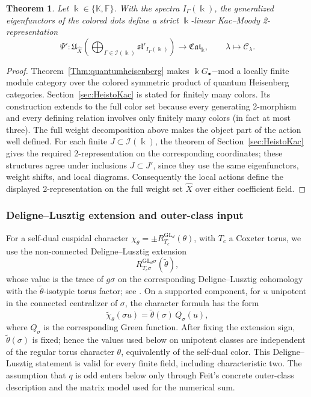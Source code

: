 \documentclass[12pt]{amsart}
\numberwithin{itemcounter}{subsection}
\theoremstyle{plain}
\newtheorem{theorem}{Theorem}[section]
\theoremstyle{definition}
\theoremstyle{remark}
\numberwithin{equation}{section}
\def\bbF{\mathbb{F}}
\def\bbK{\mathbb{K}}
\def\k{\Bbbk}
\def\fraks{\mathfrak{s}}
\def\frakl{\mathfrak{l}}
\def\frakU{\mathfrak{U}}
\def\calI{\mathcal{I}}
\def\frakl{\mathfrak{l}}
\def\GL{\mathrm{GL}}
\begin{document}
\begin{theorem}\label{ThmB}
Let \(\k\in\{\bbK,\bbF\}\).  With the spectra \(I_\Gamma(\k)\), the
generalized eigenfunctors of the colored dots define a strict \(\k\)-linear
Kac--Moody 2-representation
\[
\Psi':\frakU_{\widehat X}\!\left(
\bigoplus_{\Gamma\in\calI(\k)}
\fraks\frakl'_{I_\Gamma(\k)}\right)
\longrightarrow
\mathfrak{Cat}_\k,\qquad \lambda\longmapsto\mathcal C_\lambda.
\]
\end{theorem}
\begin{proof}
Theorem~\ref{Thm:quantumheisenberg} makes
\(\k G_\bullet\mathrm{-mod}\) a locally finite module category over the
colored symmetric product of quantum Heisenberg categories.  Section~\ref{sec:HeistoKac}
is stated for finitely many colors.  Its construction extends to the full
color set because every generating 2-morphism and every defining relation involves only finitely
many colors (in fact at most three).  The full weight decomposition above
makes the object part of the action well defined.  For each finite
\(J\subset\calI(\k)\), the theorem of Section~\ref{sec:HeistoKac} gives
the required 2-representation on the corresponding coordinates; these
structures agree under inclusions \(J\subset J'\), since they use the same
eigenfunctors, weight shifts, and local diagrams.  Consequently the local
actions define the displayed 2-representation on the full weight set
\(\widehat X\) over either coefficient field.
\end{proof}

\subsubsection{Deligne--Lusztig extension and outer-class input}
For a self-dual cuspidal character
\(\chi_\theta=\pm R_{T_c}^{\GL_d}(\theta)\), with \(T_c\) a Coxeter torus,
we use the non-connected Deligne--Lusztig extension
\[
 R_{T_c\sigma}^{\GL_d\sigma}(\widetilde\theta),
\]
whose value is the trace of \(g\sigma\) on the corresponding
Deligne--Lusztig cohomology with the \(\widetilde\theta\)-isotypic torus
factor; see \cite{DM94,Shu22}.  On a supported component, for \(u\) unipotent
in the connected centralizer of \(\sigma\), the character formula has the
form
\begin{equation}\label{eq:DL-extension-Green}
 \widetilde\chi_\theta(\sigma u)
   =\widetilde\theta(\sigma)\,Q_\sigma(u),
\end{equation}
where \(Q_\sigma\) is the corresponding Green function.  After fixing the
extension sign, \(\widetilde\theta(\sigma)\) is fixed; hence the values used
below on unipotent classes are independent of the regular torus character
\(\theta\), equivalently of the self-dual color.  This Deligne--Lusztig
statement is valid for every finite field, including characteristic two.
The assumption that \(q\) is odd enters below only through Feit's concrete
outer-class description and the matrix model used for the numerical sum.
\end{document}
